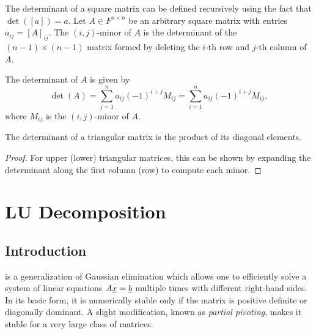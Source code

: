 The determinant of a square matrix can be defined recursively using the fact that $\det \left( [ a ] \right) = a$.
Let $A \in F^{n \times n}$ be an arbitrary square matrix with entries $a_{ij} = [ A ]_{ij}$.
The $(i,j)$-minor of $A$ is the determinant of the $(n-1)\times(n-1)$ matrix formed by deleting the $i$-th row and $j$-th column of $A$.
\begin{fact}
The determinant of $A$ is given by
\begin{equation*}
\det(A) = \sum_{j=1}^n a_{ij} (-1)^{i+j} M_{ij} = \sum_{i=1}^n a_{ij} (-1)^{i+j} M_{ij},
\end{equation*}
where $M_{ij}$ is the $(i,j)$-minor of $A$.
\end{fact}

\begin{theorem}
\label{thm:triangular_determinant}
The determinant of a triangular matrix is the product of its diagonal elements.
\end{theorem}
\begin{proof}
For upper (lower) triangular matrices, this can be shown by expanding the determinant along the first column (row) to compute each minor.
\end{proof}

\section{LU Decomposition}

\subsection{Introduction}

 is a generalization of Gaussian elimination which allows one to efficiently solve a system of linear equations $A \underline{x} = \underline{b}$ multiple times with different right-hand sides.
In its basic form, it is numerically stable only if the matrix is positive definite or diagonally dominant.
A slight modification, known as \emph{partial pivoting}, makes it stable for a very large class of matrices.


